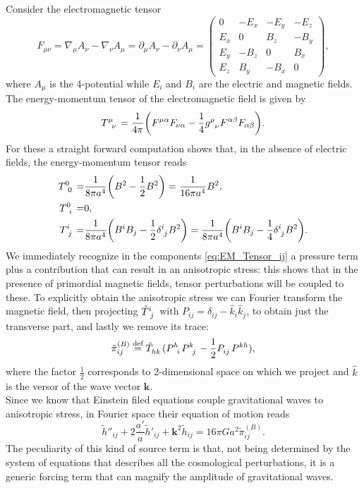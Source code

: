 Consider the electromagnetic tensor 
$$F_{\mu\nu}= \nabla_\mu A_\nu - \nabla_\nu A_\mu=\partial_\mu A_\nu-\partial_\nu A_\mu=\begin{pmatrix}
    0 & -E_x & -E_y & -E_z \\
    E_x & 0 & B_z & -B_y \\
    E_y & -B_z & 0 & B_x \\
    E_z & B_y & -B_x & 0
\end{pmatrix},$$
where $A_\mu$ is the 4-potential while $E_i$ and $B_i$ are the electric and magnetic fields. The energy-momentum tensor of the electromagnetic field is given by 
$$
\tensor{T}{^\mu_\nu}=\frac{1}{4\pi}\bigg(F^{\mu\alpha}F_{\nu\alpha}-\frac{1}{4}\tensor{g}{^\mu_\nu} F^{\alpha\beta}F_{\alpha\beta}\bigg).
$$
For these a straight forward computation shows that, in the absence of electric fields, the energy-momentum tensor reads
\begin{subequations}
    \begin{align}
    \tensor{T}{^0_0}=&\frac{1}{8\pi a^4}\bigg(B^2-\frac{1}{2}B^2\bigg)=\frac{1}{16\pi a^4}B^2,\label{eq:EM_Tensor_00}\\
    \tensor{T}{^0_i}=&0\label{eq:EM_Tensor_0i},\\
    \tensor{T}{^i_j}=&\frac{1}{8\pi a^4}\bigg(B^iB_j-\frac{1}{2}\tensor{\delta}{^i_j} B^2\bigg)=\frac{1}{8\pi a^4}\bigg(B^iB_j-\frac{1}{4}\tensor{\delta}{^i_j} B^2\bigg).\label{eq:EM_Tensor_ij}
\end{align}
\end{subequations}
We immediately recognize in the components \eqref{eq:EM_Tensor_ij} a pressure term plus a contribution that can result in an anisotropic stress: this shows that in the presence of primordial magnetic fields, tensor perturbations will be coupled to these. To explicitly obtain the anisotropic stress we can Fourier transform the magnetic field, then projecting $\tensor{\tilde T}{^i_j}$ with $P_{ij}=\delta_{ij}-\hat k_i\hat k_j$, to obtain just the transverse part, and lastly we remove its trace:
$$\tilde\pi_{ij}^{(B)}\defeq\tensor{\tilde T}{_h_k}(\tensor{P}{^h_i}\tensor{P}{^k_j}-\frac{1}{2}\tensor{P}{_i_j}\tensor{P}{^k^h}),$$
where the factor $\tfrac12$ corresponds to 2-dimensional space on which we project and $\hat{k}$ is the versor of the wave vector $\mathbf{k}$.\\
Since we know that Einstein filed equations couple gravitational waves to anisotropic stress, in Fourier space their equation of motion reads
\begin{equation}
     \tilde h''_{ij}+2\frac{a'}{a}\tilde h'_{ij}+\boldsymbol{k}^2 \tilde h_{ij}=16\pi G a^2\tilde\pi^{(B)}_{ij}.
\end{equation}
The peculiarity of this kind of source term is that, not being determined by the system of equations that describes all the cosmological perturbations, it is a generic forcing term that can magnify the amplitude of gravitational waves. 

